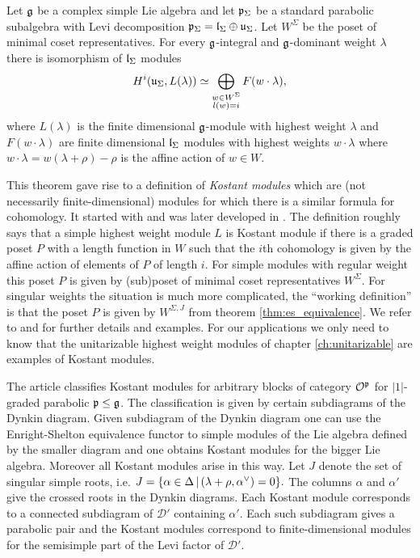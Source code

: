 \begin{theorem}
	Let $\mathfrak{g}$ be a complex simple Lie algebra and let $\mathfrak{p}_\Sigma$ be a standard parabolic subalgebra with Levi decomposition $\mathfrak{p}_\Sigma = \mathfrak{l}_\Sigma \oplus \mathfrak{u}_\Sigma$. Let $W^\Sigma$ be the poset of minimal coset representatives. For every $\mathfrak{g}$-integral and $\mathfrak{g}$-dominant weight $\lambda$ there is isomorphism of $\mathfrak{l}_\Sigma$ modules
	\begin{equation}
		 H^i(\mathfrak{u}_\Sigma, L(\lambda))\simeq \bigoplus_{\substack{w\in W^{\Sigma}\\ l(w) = i}} F(w \cdot \lambda),
	\end{equation}
	where $L(\lambda)$ is the finite dimensional $\mathfrak{g}$-module with highest weight $\lambda$ and $F(w\cdot \lambda)$ are finite dimensional $\mathfrak{l}_\Sigma$ modules with highest weights $w \cdot \lambda$ where $w \cdot \lambda = w(\lambda + \rho) - \rho$ is the affine action of $w \in W.$
\end{theorem}

This theorem gave rise to a definition of \emph{Kostant modules} which are (not necessarily finite-dimensional) modules for which there is a similar formula for cohomology. It started with \cite{collingwood_mathfrakn-homology_1985} and was later developed in \cite{boe_kostant_2009}. The definition roughly says that a simple highest weight module $L$ is Kostant module if there is a graded poset $P$ with a length function in $W$ such that the $i$th cohomology is given by the affine action of elements of $P$ of length $i$. For simple modules with regular weight this poset $P$ is given by (sub)poset of minimal coset representatives $W^\Sigma$. For singular weights the situation is much more complicated, the ``working definition'' is that the poset $P$ is given by $W^{\Sigma, J}$ from theorem \ref{thm:es_equivalence}. We refer to \cite{boe_kostant_2009} and \cite{enright_diagrams_2014} for further details and examples. For our applications we only need to know that the unitarizable highest weight modules of chapter \ref{ch:unitarizable} are examples of Kostant modules.

The article \cite{boe_kostant_2009} classifies Kostant modules for arbitrary blocks of category $\mathcal{O}^{\mathfrak{p}}$ for $|1|$-graded parabolic $\mathfrak{p} \leq \mathfrak{g}$. The classification is given by certain subdiagrams of the Dynkin diagram. Given subdiagram of the Dynkin diagram one can use the Enright-Shelton equivalence functor to simple modules of the Lie algebra defined by the smaller diagram and one obtains Kostant modules for the bigger Lie algebra. Moreover all Kostant modules arise in this way. Let $J$ denote the set of singular simple roots, i.e. \(J= \{ \alpha \in \Delta \,|\, (\lambda+\rho,\alpha^\vee) = 0 \}.\) The columns $\alpha$ and $\alpha'$ give the crossed roots in the Dynkin diagrams. Each Kostant module corresponds to a connected subdiagram of $\mathcal{D}'$ containing $\alpha'$. Each such subdiagram gives a parabolic pair and the Kostant modules correspond to finite-dimensional modules for the semisimple part of the Levi factor of $\mathcal{D}'$.

